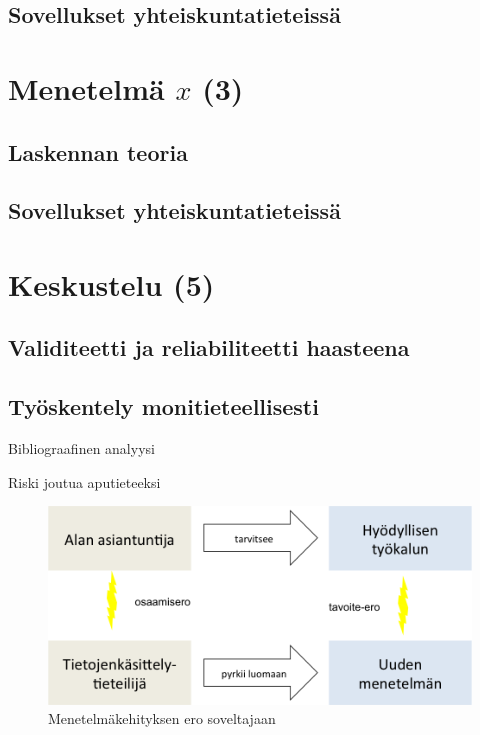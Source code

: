 \documentclass[finnish,gradu,twoside,12pt]{tktltiki}
\begin{document}
{\subsection{Sovellukset yhteiskuntatieteissä}

\cite{collingwood12}

\newpage

\section{Menetelmä $x$ (3)}

\subsection{Laskennan teoria}

\subsection{Sovellukset yhteiskuntatieteissä}

\newpage

\section{Keskustelu (5)}

\subsection{Validiteetti ja reliabiliteetti haasteena}

\subsection{Työskentely monitieteellisesti}

Bibliograafinen analyysi

Riski joutua aputieteeksi

\begin{figure}

\includegraphics[width=.6\textwidth]{images/monitieteellisyys_ongelma.png} 
\caption{Menetelmäkehityksen ero soveltajaan \citep[mukaillen][7]{Wijk2006}}
\label{fig:domain_expert_vs_computation_specialist}


\end{figure}}
\end{document}
